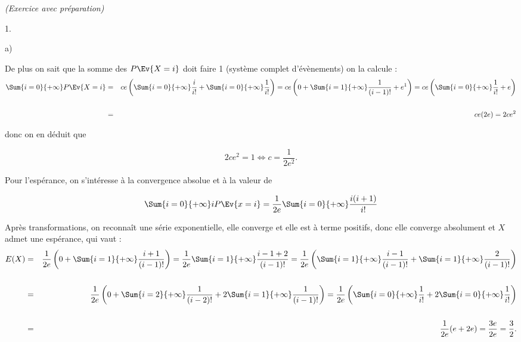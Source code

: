 \documentclass[11pt]{article}%
\begin{document}
\begin{exercice}{\it (Exercice avec préparation)}
\begin{noliste}{1.}
\begin{noliste}{a)}

 De plus on sait que la somme des $P \Ev{X = i}$ doit faire 1 (système
complet d'évènements) on la calcule : 
 \begin{eqnarray*}
 \Sum{i = 0}{+ \infty} P \Ev{X = i} & = & c e \left( \Sum{i = 0}{+
\infty} \frac{ i }{ i! } + \Sum{i = 0}{+ \infty}\frac{ 1 }{ i! }
\right) = c e \left( 0 + \Sum{i = 1}{+ \infty} \frac{ 1 }{ (i-1)! } +
e^{1} \right) = c e \left( \Sum{i = 0}{+ \infty} \frac{ 1 }{ i! } + e
\right) \\
\\
 & = & c e ( 2 e ) = 2 c e^{2} 
 \end{eqnarray*}

 donc on en déduit que
 
\[
 2 c e^{2} = 1 \Longleftrightarrow c = \frac{ 1 }{ 2 e^{2} }. 
\]

 \item Pour l'espérance, on s'intéresse à la convergence absolue et à
la valeur de 
 
\[
 \Sum{i = 0}{+ \infty} i P \Ev{x = i } = \frac{ 1 }{ 2 e } \Sum{i =
0}{+ \infty} \frac{ i (i + 1 ) }{ i! } 
\]

 Après transformations, on reconnaît une série exponentielle, elle
converge et elle est à terme positifs, donc elle converge absolument et
$X$ admet une espérance, qui vaut : 
 \begin{eqnarray*}
 E ( X ) & = & \frac{ 1 }{ 2 e } \left( 0 + \Sum{i = 1}{+ \infty}
\frac{ i + 1 }{ (i-1)! } \right) = \frac{ 1 }{ 2 e } \Sum{i = 1}{+
\infty} \frac{ i - 1 + 2 }{ (i-1)! } = \frac{ 1 }{ 2 e } \left( \Sum{i
= 1}{+ \infty} \frac{ i - 1 }{ (i-1)! } + \Sum{i = 1}{+ \infty} \frac{2
}{ (i-1)! } \right) \\
\\
 & = & \frac{ 1 }{ 2 e } \left( 0 + \Sum{i = 2}{+ \infty} \frac{ 1 }{
(i-2)! } + 2 \Sum{i = 1}{+ \infty} \frac{1 }{ (i-1)! } \right) = \frac{
1 }{ 2 e } \left( \Sum{i = 0}{+ \infty} \frac{ 1 }{ i! } + 2 \Sum{i =
0}{+ \infty} \frac{1 }{ i! } \right) \\
\\
 & = & \frac{ 1 }{ 2 e } ( e + 2e ) = \frac{ 3 e }{ 2e } = \frac{ 3 }{
2 }.
 \end{eqnarray*}


\end{noliste}
\end{noliste}
\end{exercice}
\end{document}
